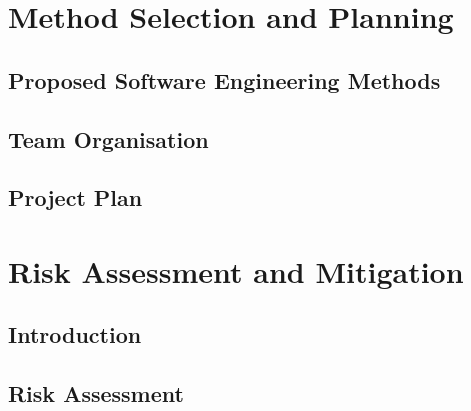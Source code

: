 \documentclass{report}   	%
\begin{document}
\chapter{Method Selection and Planning}
\section{Proposed Software Engineering Methods}
\section{Team Organisation}
\section{Project Plan}

\chapter{Risk Assessment and Mitigation}
\section{Introduction}
\section{Risk Assessment}
\end{document}
